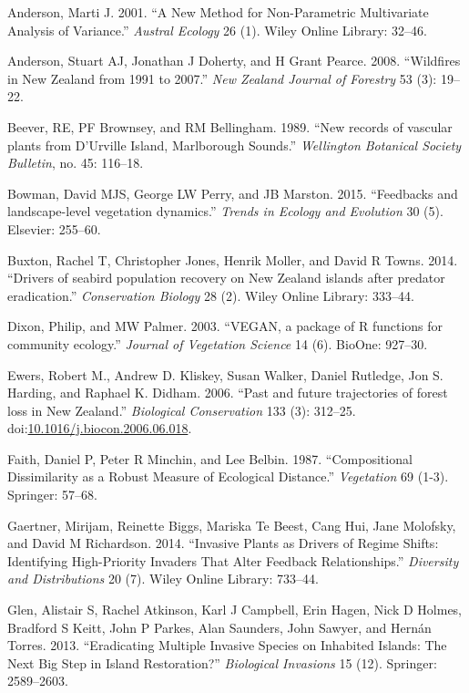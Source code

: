 \documentclass[]{article}
\begin{document}
Anderson, Marti J. 2001. ``A New Method for Non-Parametric Multivariate Analysis of Variance.'' \emph{Austral Ecology} 26 (1). Wiley Online Library: 32--46.

Anderson, Stuart AJ, Jonathan J Doherty, and H Grant Pearce. 2008. ``Wildfires in New Zealand from 1991 to 2007.'' \emph{New Zealand Journal of Forestry} 53 (3): 19--22.

Beever, RE, PF Brownsey, and RM Bellingham. 1989. ``New records of vascular plants from D'Urville Island, Marlborough Sounds.'' \emph{Wellington Botanical Society Bulletin}, no. 45: 116--18.

Bowman, David MJS, George LW Perry, and JB Marston. 2015. ``Feedbacks and landscape-level vegetation dynamics.'' \emph{Trends in Ecology and Evolution} 30 (5). Elsevier: 255--60.

Buxton, Rachel T, Christopher Jones, Henrik Moller, and David R Towns. 2014. ``Drivers of seabird population recovery on New Zealand islands after predator eradication.'' \emph{Conservation Biology} 28 (2). Wiley Online Library: 333--44.

Dixon, Philip, and MW Palmer. 2003. ``VEGAN, a package of R functions for community ecology.'' \emph{Journal of Vegetation Science} 14 (6). BioOne: 927--30.

Ewers, Robert M., Andrew D. Kliskey, Susan Walker, Daniel Rutledge, Jon S. Harding, and Raphael K. Didham. 2006. ``Past and future trajectories of forest loss in New Zealand.'' \emph{Biological Conservation} 133 (3): 312--25. doi:\href{https://doi.org/10.1016/j.biocon.2006.06.018}{10.1016/j.biocon.2006.06.018}.

Faith, Daniel P, Peter R Minchin, and Lee Belbin. 1987. ``Compositional Dissimilarity as a Robust Measure of Ecological Distance.'' \emph{Vegetation} 69 (1-3). Springer: 57--68.

Gaertner, Mirijam, Reinette Biggs, Mariska Te Beest, Cang Hui, Jane Molofsky, and David M Richardson. 2014. ``Invasive Plants as Drivers of Regime Shifts: Identifying High-Priority Invaders That Alter Feedback Relationships.'' \emph{Diversity and Distributions} 20 (7). Wiley Online Library: 733--44.

Glen, Alistair S, Rachel Atkinson, Karl J Campbell, Erin Hagen, Nick D Holmes, Bradford S Keitt, John P Parkes, Alan Saunders, John Sawyer, and Hernán Torres. 2013. ``Eradicating Multiple Invasive Species on Inhabited Islands: The Next Big Step in Island Restoration?'' \emph{Biological Invasions} 15 (12). Springer: 2589--2603.
\end{document}
